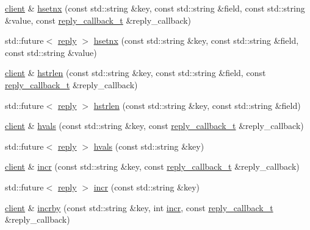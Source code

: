 \begin{DoxyCompactItemize}
\item 
\hyperlink{classcpp__redis_1_1client}{client} \& \hyperlink{classcpp__redis_1_1client_a6cf21d60012fc82075deb801a32e8d60}{hsetnx} (const std\+::string \&key, const std\+::string \&field, const std\+::string \&value, const \hyperlink{classcpp__redis_1_1client_a061a1140d36d2eaeda82b09a0bb3f9f2}{reply\+\_\+callback\+\_\+t} \&reply\+\_\+callback)
\item 
std\+::future$<$ \hyperlink{classcpp__redis_1_1reply}{reply} $>$ \hyperlink{classcpp__redis_1_1client_a72b5a16cc761f51e9986bcfcf644e999}{hsetnx} (const std\+::string \&key, const std\+::string \&field, const std\+::string \&value)
\item 
\hyperlink{classcpp__redis_1_1client}{client} \& \hyperlink{classcpp__redis_1_1client_a5e1543cd782d3ff9d17de5e200fd038a}{hstrlen} (const std\+::string \&key, const std\+::string \&field, const \hyperlink{classcpp__redis_1_1client_a061a1140d36d2eaeda82b09a0bb3f9f2}{reply\+\_\+callback\+\_\+t} \&reply\+\_\+callback)
\item 
std\+::future$<$ \hyperlink{classcpp__redis_1_1reply}{reply} $>$ \hyperlink{classcpp__redis_1_1client_a612c5f64a9fec6c8c2df8b113173146a}{hstrlen} (const std\+::string \&key, const std\+::string \&field)
\item 
\hyperlink{classcpp__redis_1_1client}{client} \& \hyperlink{classcpp__redis_1_1client_af74a8adbcd6f21178b43f3f2edddb472}{hvals} (const std\+::string \&key, const \hyperlink{classcpp__redis_1_1client_a061a1140d36d2eaeda82b09a0bb3f9f2}{reply\+\_\+callback\+\_\+t} \&reply\+\_\+callback)
\item 
std\+::future$<$ \hyperlink{classcpp__redis_1_1reply}{reply} $>$ \hyperlink{classcpp__redis_1_1client_af391940cf5b996a0682e881da446b7da}{hvals} (const std\+::string \&key)
\item 
\hyperlink{classcpp__redis_1_1client}{client} \& \hyperlink{classcpp__redis_1_1client_a2f9ba6c7e83451207403096b19da4faa}{incr} (const std\+::string \&key, const \hyperlink{classcpp__redis_1_1client_a061a1140d36d2eaeda82b09a0bb3f9f2}{reply\+\_\+callback\+\_\+t} \&reply\+\_\+callback)
\item 
std\+::future$<$ \hyperlink{classcpp__redis_1_1reply}{reply} $>$ \hyperlink{classcpp__redis_1_1client_a36ce71119f98cdc29fb29ca33c8b1ff1}{incr} (const std\+::string \&key)
\item 
\hyperlink{classcpp__redis_1_1client}{client} \& \hyperlink{classcpp__redis_1_1client_a7ee625ebbbfc9fb6f9821b94055e0a5c}{incrby} (const std\+::string \&key, int \hyperlink{classcpp__redis_1_1client_a2f9ba6c7e83451207403096b19da4faa}{incr}, const \hyperlink{classcpp__redis_1_1client_a061a1140d36d2eaeda82b09a0bb3f9f2}{reply\+\_\+callback\+\_\+t} \&reply\+\_\+callback)

\end{DoxyCompactItemize}
